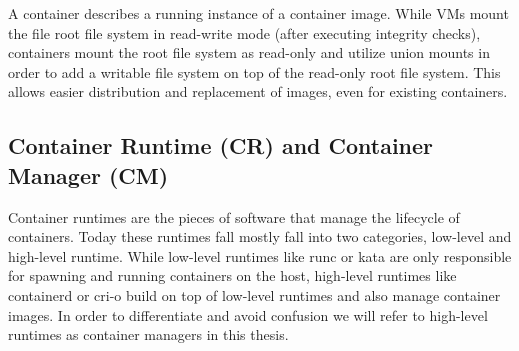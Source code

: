 A container describes a running instance of a container image. While VMs mount
the file root file system in read-write mode (after executing integrity checks),
containers mount the root file system as read-only and utilize union mounts in
order to add a writable file system on top of the read-only root file system.
This allows easier distribution and replacement of images, even for existing
containers.

\subsection{Container Runtime (CR) and Container Manager (CM)}
\label{sec:container-runtime}


Container runtimes are the pieces of software that manage the lifecycle of
containers. Today these runtimes fall mostly fall into two categories, low-level
and high-level runtime. While low-level runtimes like runc or kata are only
responsible for spawning and running containers on the host, high-level runtimes
like containerd or cri-o build on top of low-level runtimes and also manage
container images. In order to differentiate and avoid confusion we will refer to
high-level runtimes as container managers in this thesis.
